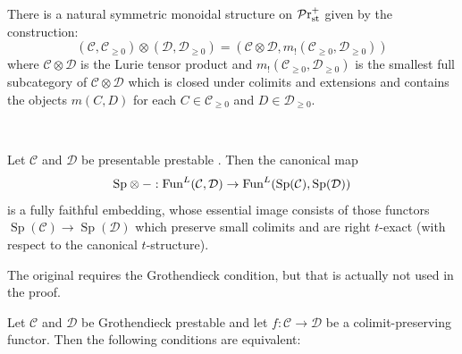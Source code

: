 \documentclass[a4paper,10pt, oneside]{amsart}
\begin{document}
	\begin{de}
		There is a natural symmetric monoidal structure on $\mathcal{P}\mathrm{r}^{+}_{\mathrm{st}}$ given by the construction:
		$$
		\left(\mathcal{C}, \mathcal{C}_{\geq 0}\right) \otimes\left(\mathcal{D}, \mathcal{D}_{\geq 0}\right)=\left(\mathcal{C} \otimes \mathcal{D}, m_{!}\left(\mathcal{C}_{\geq 0}, \mathcal{D}_{\geq 0}\right)\right)
		$$
		where $\mathcal{C} \otimes \mathcal{D}$ is the Lurie tensor product and $m_{!}\left(\mathcal{C}_{\geq 0}, \mathcal{D}_{\geq 0}\right)$ is the smallest full subcategory of $\mathcal{C} \otimes \mathcal{D}$ which is closed under colimits and extensions and contains the objects $m(C, D)$ for each $C \in \mathcal{C}_{\geq 0}$ and $D \in \mathcal{D}_{\geq 0}$.
	\end{de}
	
	\begin{rem}\label{prt-rex}\,
	\end{rem}
	
	\begin{prop}\label{prestemb}
		Let $\mathcal{C}$ and $\mathcal{D}$ be presentable prestable \infcats. Then the canonical map
		$$
		\mathrm{Sp}\otimes-: \operatorname{Fun}^L(\mathcal{C}, \mathcal{D}) \rightarrow \operatorname{Fun}^L(\operatorname{Sp}(\mathcal{C}), \operatorname{Sp}(\mathcal{D}))
		$$
		is a fully faithful embedding, whose essential image consists of those functors $\operatorname{Sp}(\mathcal{C}) \rightarrow \operatorname{Sp}(\mathcal{D})$ which preserve small colimits and are right $t$-exact (with respect to the canonical $t$-structure).
	\end{prop}
	\begin{rem}
		The original \cite[Proposition C.3.1.1]{sag} requires the Grothendieck condition, but that is actually not used in the proof.
	\end{rem}
	\begin{prop}\label{t-ex}
		Let $\mathcal{C}$ and $\mathcal{D}$ be Grothendieck prestable \infcats and let $f: \mathcal{C} \rightarrow \mathcal{D}$ be a colimit-preserving functor. Then the following conditions are equivalent:
	\end{prop}
	
\end{document}
